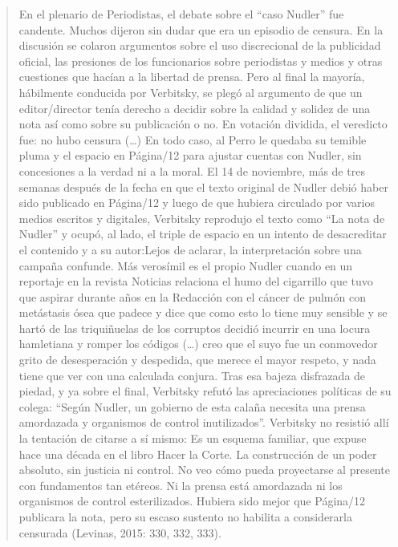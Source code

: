 \begin{quote}
En el plenario de Periodistas, el debate sobre el \enquote{caso Nudler} fue candente. Muchos dijeron sin dudar que era un episodio de censura. En la discusión se colaron argumentos sobre el uso discrecional de la publicidad oficial, las presiones de los funcionarios sobre periodistas y medios y otras cuestiones que hacían a la libertad de prensa. Pero al final la mayoría, hábilmente conducida por Verbitsky, se plegó al argumento de que un editor/director tenía derecho a decidir sobre la calidad y solidez de una nota así como sobre su publicación o no. En votación dividida, el veredicto fue: no hubo censura (\ldots) En todo caso, al Perro le quedaba su temible pluma y el espacio en Página/12 para ajustar cuentas con Nudler, sin concesiones a la verdad ni a la moral. El 14 de noviembre, más de tres semanas después de la fecha en que el texto original de Nudler debió haber sido publicado en Página/12 y luego de que hubiera circulado por varios medios escritos y digitales, Verbitsky reprodujo el texto como \enquote{La nota de Nudler} y ocupó, al lado, el triple de espacio en un intento de desacreditar el contenido y a su autor:Lejos de aclarar, la interpretación sobre una campaña confunde. Más verosímil es el propio Nudler cuando en un reportaje en la revista Noticias relaciona el humo del cigarrillo que tuvo que aspirar durante años en la Redacción con el cáncer de pulmón con metástasis ósea que padece y dice que como esto lo tiene muy sensible y se hartó de las triquiñuelas de los corruptos decidió incurrir en una locura hamletiana y romper los códigos (\ldots) creo que el suyo fue un conmovedor grito de desesperación y despedida, que merece el mayor respeto, y nada tiene que ver con una calculada conjura. Tras esa bajeza disfrazada de piedad, y ya sobre el final, Verbitsky refutó las apreciaciones políticas de su colega: \enquote{Según Nudler, un gobierno de esta calaña necesita una prensa amordazada y organismos de control inutilizados}. Verbitsky no resistió allí la tentación de citarse a sí mismo: Es un esquema familiar, que expuse hace una década en el libro Hacer la Corte. La construcción de un poder absoluto, sin justicia ni control. No veo cómo pueda proyectarse al presente con fundamentos tan etéreos. Ni la prensa está amordazada ni los organismos de control esterilizados. Hubiera sido mejor que Página/12 publicara la nota, pero su escaso sustento no habilita a considerarla censurada (Levinas, 2015: 330, 332, 333).
\end{quote}

